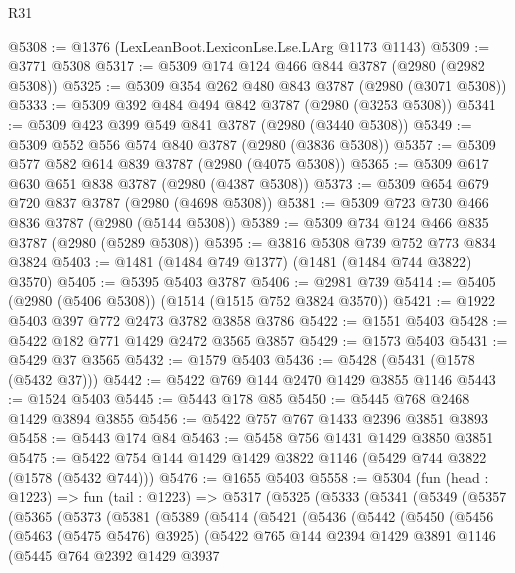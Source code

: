 \begin{lexlean}{R31}
\begin{coremodule}
@5308 := @1376 (LexLeanBoot.LexiconLse.Lse.LArg @1173 @1143)
@5309 := @3771 @5308
@5317 := @5309 @174 @124 @466 @844 @3787 (@2980 (@2982 @5308))
@5325 := @5309 @354 @262 @480 @843 @3787 (@2980 (@3071 @5308))
@5333 := @5309 @392 @484 @494 @842 @3787 (@2980 (@3253 @5308))
@5341 := @5309 @423 @399 @549 @841 @3787 (@2980 (@3440 @5308))
@5349 := @5309 @552 @556 @574 @840 @3787 (@2980 (@3836 @5308))
@5357 := @5309 @577 @582 @614 @839 @3787 (@2980 (@4075 @5308))
@5365 := @5309 @617 @630 @651 @838 @3787 (@2980 (@4387 @5308))
@5373 := @5309 @654 @679 @720 @837 @3787 (@2980 (@4698 @5308))
@5381 := @5309 @723 @730 @466 @836 @3787 (@2980 (@5144 @5308))
@5389 := @5309 @734 @124 @466 @835 @3787 (@2980 (@5289 @5308))
@5395 := @3816 @5308 @739 @752 @773 @834 @3824
@5403 := @1481 (@1484 @749 @1377) (@1481 (@1484 @744 @3822) @3570)
@5405 := @5395 @5403 @3787
@5406 := @2981 @739
@5414 := @5405 (@2980 (@5406 @5308)) (@1514 (@1515 @752 @3824 @3570))
@5421 := @1922 @5403 @397 @772 @2473 @3782 @3858 @3786
@5422 := @1551 @5403
@5428 := @5422 @182 @771 @1429 @2472 @3565 @3857
@5429 := @1573 @5403
@5431 := @5429 @37 @3565
@5432 := @1579 @5403
@5436 := @5428 (@5431 (@1578 (@5432 @37)))
@5442 := @5422 @769 @144 @2470 @1429 @3855 @1146
@5443 := @1524 @5403
@5445 := @5443 @178 @85
@5450 := @5445 @768 @2468 @1429 @3894 @3855
@5456 := @5422 @757 @767 @1433 @2396 @3851 @3893
@5458 := @5443 @174 @84
@5463 := @5458 @756 @1431 @1429 @3850 @3851
@5475 := @5422 @754 @144 @1429 @1429 @3822 @1146 (@5429 @744 @3822 (@1578 (@5432 @744)))
@5476 := @1655 @5403
@5558 := @5304
    (fun (head : @1223) =>
    fun (tail : @1223) =>
    @5317
      (@5325
        (@5333
          (@5341
            (@5349
              (@5357
                (@5365
                  (@5373
                    (@5381
                      (@5389
                        (@5414
                          (@5421
                            (@5436
                              (@5442
                                (@5450
                                  (@5456
                                    (@5463 (@5475 @5476) @3925)
                                    (@5422
                                      @765
                                      @144
                                      @2394
                                      @1429
                                      @3891
                                      @1146
                                      (@5445
                                        @764
                                        @2392
                                        @1429
                                        @3937

\end{coremodule}
\end{lexlean}
